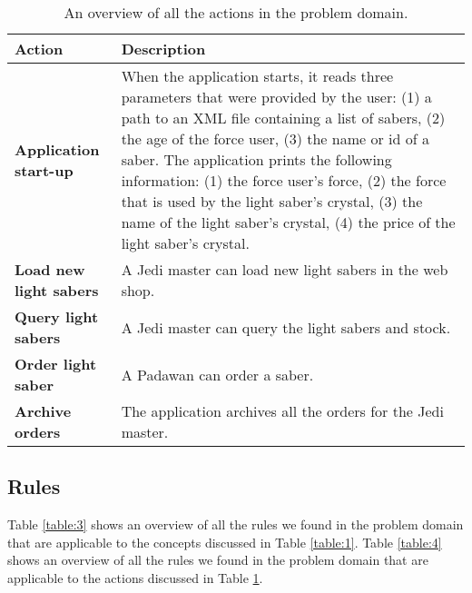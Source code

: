 \documentclass[a4paper]{article}
\begin{document}
\begin{table}
	\centering
	\caption{An overview of all the actions in the problem domain.}
	\label{table:2}
	\begin{tabular}{|p{3cm}|p{8.5cm}|} \hline
		\textbf{Action} & \textbf{Description} \\ \hline
		
		\textbf{Application start-up} & When the application starts, it reads three parameters that were provided by the user: (1) a path to an XML file containing a list of sabers, (2) the age of the force user, (3) the name or id of a saber. The application prints the following information: (1) the force user's force, (2) the force that is used by the light saber's crystal, (3) the name of the light saber's crystal, (4) the price of the light saber's crystal.\\ \hline
		
		\textbf{Load new light sabers} & A Jedi master can load new light sabers in the web shop.\\ \hline
		
		\textbf{Query light sabers} & A Jedi master can query the light sabers and stock.\\ \hline
		
		\textbf{Order light saber} & A Padawan can order a saber.\\ \hline
		
		\textbf{Archive orders} & The application archives all the orders for the Jedi master.\\ \hline
	\end{tabular}
\end{table}

\subsection{Rules}
Table \ref{table:3} shows an overview of all the rules we found in the problem domain that are applicable to the concepts discussed in Table \ref{table:1}. Table \ref{table:4} shows an overview of all the rules we found in the problem domain that are applicable to the actions discussed in Table \ref{table:2}. 
\end{document}
